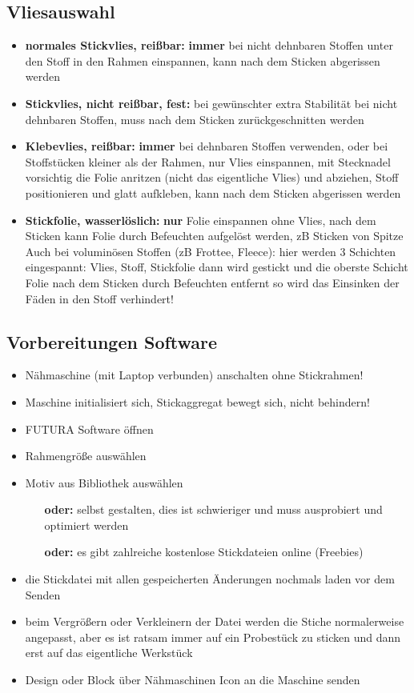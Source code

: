 \documentclass{\basedir/fablab-document}
\begin{document}
\subsection{Vliesauswahl}
\begin{itemize}
 \item \textbf{normales Stickvlies, reißbar:} \textbf{immer} bei nicht dehnbaren Stoffen unter den Stoff in den Rahmen einspannen, kann nach dem Sticken abgerissen werden
 \item \textbf{Stickvlies, nicht reißbar, fest:} bei gewünschter extra Stabilität bei nicht dehnbaren Stoffen, muss nach dem Sticken zurückgeschnitten werden
 \item \textbf{Klebevlies, reißbar:} \textbf{immer} bei dehnbaren Stoffen verwenden, oder bei Stoffstücken kleiner als der Rahmen, nur Vlies einspannen, mit Stecknadel vorsichtig die Folie anritzen (nicht das eigentliche Vlies) und abziehen, Stoff positionieren und glatt aufkleben, kann nach dem Sticken abgerissen werden
 \item \textbf{Stickfolie, wasserlöslich:} \textbf{nur} Folie einspannen ohne Vlies, nach dem Sticken kann Folie durch Befeuchten aufgelöst werden, zB Sticken von Spitze
Auch bei voluminösen Stoffen (zB Frottee, Fleece): hier werden 3 Schichten eingespannt: Vlies, Stoff, Stickfolie dann wird gestickt und die oberste Schicht Folie nach dem Sticken durch Befeuchten entfernt
so wird das Einsinken der Fäden in den Stoff verhindert!
\end{itemize}

\subsection{Vorbereitungen Software}
\begin{itemize}
 \item Nähmaschine (mit Laptop verbunden) anschalten ohne Stickrahmen!
 \item Maschine initialisiert sich, Stickaggregat bewegt sich, nicht behindern!
 \item FUTURA Software öffnen
 \item Rahmengröße auswählen
 \item Motiv aus Bibliothek auswählen
 \begin{itemize}
	\item[\textbf{oder:}] selbst gestalten, dies ist schwieriger und muss ausprobiert und optimiert 
werden
	\item[\textbf{oder:}] es gibt zahlreiche kostenlose Stickdateien online (Freebies)
 \end{itemize}
 \item die Stickdatei mit allen gespeicherten Änderungen nochmals laden vor dem Senden
 \item beim Vergrößern oder Verkleinern der Datei werden die Stiche normalerweise angepasst, aber es ist ratsam immer auf ein Probestück zu sticken und dann erst auf das eigentliche Werkstück
 \item Design oder Block über Nähmaschinen Icon an die Maschine senden
\end{itemize}
\end{document}
